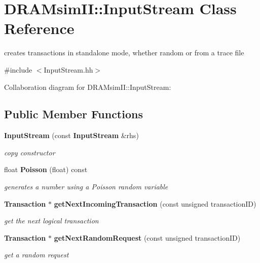 \section{DRAMsimII::InputStream Class Reference}
\label{class_d_r_a_msim_i_i_1_1_input_stream}


creates transactions in standalone mode, whether random or from a trace file  




{\ttfamily \#include $<$InputStream.hh$>$}



Collaboration diagram for DRAMsimII::InputStream:\subsection*{Public Member Functions}
\begin{DoxyCompactItemize}
\item 
{\bf InputStream} (const {\bf InputStream} \&rhs)\label{class_d_r_a_msim_i_i_1_1_input_stream_ab7a2341cd4a7baa33c292700db305469}

\begin{DoxyCompactList}\small\item\em copy constructor \item\end{DoxyCompactList}\item 
float {\bf Poisson} (float) const 
\begin{DoxyCompactList}\small\item\em generates a number using a Poisson random variable \item\end{DoxyCompactList}\item 
{\bf Transaction} $\ast$ {\bf getNextIncomingTransaction} (const unsigned transactionID)
\begin{DoxyCompactList}\small\item\em get the next logical transaction \item\end{DoxyCompactList}\item 
{\bf Transaction} $\ast$ {\bf getNextRandomRequest} (const unsigned transactionID)
\begin{DoxyCompactList}\small\item\em get a random request \item\end{DoxyCompactList}\end{DoxyCompactItemize}
